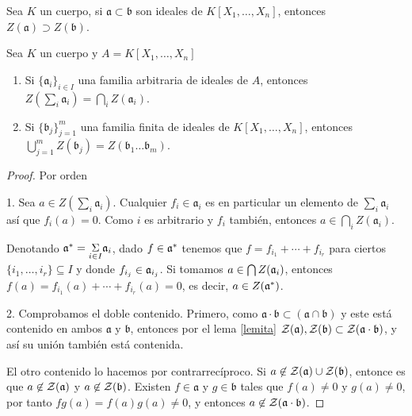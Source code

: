 \documentclass[./main.tex]{subfiles}
\begin{document}
\begin{lemma} \label{lemita}
Sea $K$ un cuerpo, si $\mathfrak{a}\subset \mathfrak b$ son ideales de $K[X_1,\ldots, X_n]$, entonces $Z(\mathfrak{a}) \supset Z (\mathfrak b)$.
\end{lemma}

\begin{proposition}
Sea $K$ un cuerpo y $A = K[X_1,\dots , X_n]$
\begin{enumerate}
    \item Si $\{\mathfrak a_i\}_{i\in I}$ una familia arbitraria de ideales de $A$, entonces $Z(\sum_i \mathfrak a_i) = \bigcap_i Z(\mathfrak a_i)$.
    \item Si $\{\mathfrak b_j\}_{j = 1}^m$ una familia finita de ideales de $K[X_1,\dots , X_n]$, entonces $\bigcup_{j=1}^m Z(\mathfrak b_j) = Z(\mathfrak b_1 \dots \mathfrak b_m)$.
\end{enumerate}
\end{proposition}
\begin{proof}
Por orden

1. Sea $a\in Z(\sum_i \mathfrak a_i)$. Cualquier $f_i \in \mathfrak a_i$ es en particular un elemento de $\sum_i \mathfrak a_i$ así que $f_i(a)  = 0$. Como $i$ es arbitrario y $f_i$ también, entonces $a \in \bigcap_i Z(\mathfrak a_i)$.

 Denotando $\mathfrak{a}^*=\underset{i\in I}{\Sigma}\mathfrak{a}_i$, dado $f\in\mathfrak{a}^*$ tenemos que $f=f_{i_1}+\cdots+f_{i_r}$ para ciertos $\{i_1,\dots,i_r\}\subseteq I$ y donde $f_{i_j}\in\mathfrak{a}_{i_j}$. Si tomamos $a\in\bigcap Z(\mathfrak{a}_i)$, entonces $f(a)=f_{i_1}(a)+\cdots+f_{i_r}(a)=0$, es decir, $a\in Z(\mathfrak{a}^*)$.



2. Comprobamos el doble contenido. Primero, como $\mathfrak a \cdot \mathfrak b \subset ( \mathfrak a \cap \mathfrak b )$ y este está contenido en ambos $\mathfrak a$ y $\mathfrak b$, entonces por el lema \ref{lemita} $\mathcal{Z}(\mathfrak a), \mathcal{Z}(\mathfrak b)\subset \mathcal{Z}(\mathfrak a \cdot \mathfrak b) $, y así su unión también está contenida.

El otro contenido lo hacemos por contrarrecíproco.  Si $a\not\in \mathcal{Z}(\mathfrak a)\cup \mathcal{Z}(\mathfrak b)$, entonce es que $a\not\in \mathcal{Z}( \mathfrak a)$ y $a\not\in \mathcal{Z}( \mathfrak b)$. Existen $f\in \mathfrak a$ y $g\in \mathfrak b$ tales que $f(a)\neq 0$ y $g(a) \neq 0$, por tanto $fg(a) = f(a)g(a) \neq 0$, y entonces $a\not\in \mathcal{Z}(\mathfrak a\cdot \mathfrak b)$.

\end{proof}
\end{document}
